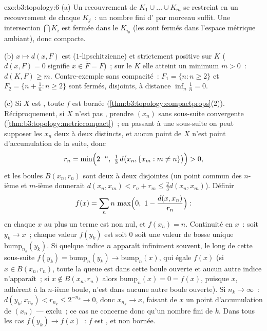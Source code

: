 \begin{solution}{exo:b3:topology:6}
(a) Un recouvrement de $K_1 \cup \dots \cup K_m$ se restreint
en un recouvrement de chaque $K_j$~: un nombre fini d'
par morceau suffit. Une intersection $\bigcap K_i$ est fermée
dans le  $K_{i_0}$ (les  sont fermés dans
l'espace métrique ambiant), donc compacte.

(b) $x \mapsto d(x, F)$ est  ($1$-lipschitzienne) et
strictement positive sur $K$ ($d(x, F) = 0$ signifie $x \in
\bar F = F$)~; sur le  $K$ elle atteint un minimum $m >
0$~: $d(K, F) \geq m$. Contre-exemple sans compacité~: $F_1 =
\{n : n \geq 2\}$ et $F_2 = \{n + \frac1n : n \geq 2\}$ sont
fermés, disjoints, à distance $\inf_n \frac1n = 0$.

(c) Si $X$ est , toute $f$  est bornée
(\cref{thm:b3:topology:compactprops}(2)). Réciproquement, si
$X$ n'est pas , prendre $(x_n)$ sans sous-suite
convergente (\cref{thm:b3:topology:metriccompact})~; en
passant à une sous-suite on peut supposer les $x_n$ deux à
deux distincts, et aucun point de $X$ n'est point
d'accumulation de la suite, donc
\[
r_n = \min\Bigl(2^{-n},\ \tfrac13\,d\bigl(x_n, \{x_m : m \neq
n\}\bigr)\Bigr) > 0,
\]
et les boules $B(x_n, r_n)$ sont deux à deux disjointes (un
point commun des $n$-ième et $m$-ième donnerait $d(x_n, x_m) <
r_n + r_m \leq \frac23 d(x_n, x_m)$). Définir
\[
f(x) = \sum_{n} n\,\max\Bigl(0,\ 1 - \frac{d(x,
x_n)}{r_n}\Bigr):
\]
en chaque $x$ au plus un terme est non nul, et $f(x_n) = n$.
Continuité en $x$~: soit $y_k \to x$~; chaque valeur $f(y_k)$
est soit $0$ soit une valeur de bosse unique
$\mathrm{bump}_{n_k}(y_k)$. Si quelque indice $n$ apparaît
infiniment souvent, le long de cette sous-suite $f(y_k) =
\mathrm{bump}_n(y_k) \to \mathrm{bump}_n(x)$, qui égale
$f(x)$ (si $x \in B(x_n, r_n)$, toute la queue est dans
cette boule ouverte et aucun autre indice n'apparaît~; si $x
\notin B(x_n, r_n)$ alors $\mathrm{bump}_n(x) = 0 = f(x)$,
puisque $x$, adhérent à la $n$-ième boule, n'est dans aucune
autre boule ouverte). Si $n_k \to \infty$~: $d(y_k, x_{n_k})
< r_{n_k} \leq 2^{-n_k} \to 0$, donc $x_{n_k} \to x$, faisant
de $x$ un point d'accumulation de $(x_n)$ --- exclu~; ce cas
ne concerne donc qu'un nombre fini de $k$. Dans tous les cas
$f(y_k) \to f(x)$~: $f$ est , et non bornée.
\end{solution}

